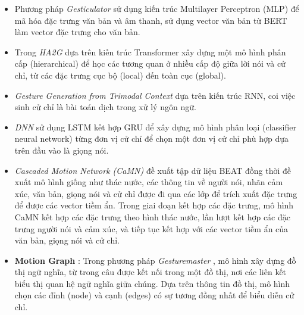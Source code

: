 \begin{itemize}[]
	\item Phương pháp \textit{Gesticulator} \cite{kucherenko2020gesticulator} sử dụng kiến trúc Multilayer Perceptron (MLP) để mã hóa đặc trưng văn bản và âm thanh, sử dụng vector văn bản từ BERT làm vector đặc trưng cho văn bản. 
	
	\item Trong \textit{HA2G} \cite{liu2022learning} dựa trên kiến trúc Transformer xây dựng một mô hình phân cấp (hierarchical) để học các tương quan ở nhiều cấp độ giữa lời nói và cử chỉ, từ các đặc trưng cục bộ (local) đến toàn cục (global). 
	
	\item \textit{Gesture Generation from Trimodal Context} \cite{yoon2020speech} dựa trên kiến trúc RNN, coi việc sinh cử chỉ là bài toán dịch trong xử lý ngôn ngữ. 
	
	\item \textit{DNN} \cite{chiu2015predicting} sử dụng LSTM kết hợp GRU để xây dựng mô hình phân loại (classifier neural network) từng đơn vị cử chỉ để chọn một đơn vị cử chỉ phù hợp dựa trên đầu vào là giọng nói. 
	
	\item \textit{Cascaded Motion Network (CaMN)} \cite{liu2022beat} đề xuất tập dữ liệu BEAT đồng thời đề xuất mô hình giống như thác nước, các thông tin về người nói, nhãn cảm xúc, văn bản, giọng nói và cử chỉ được đi qua các lớp để trích xuất đặc trưng để được các vector tiềm ẩn. Trong giai đoạn kết hợp các đặc trưng, mô hình CaMN kết hợp các đặc trưng theo hình thác nước, lần lượt kết hợp các đặc trưng người nói và cảm xúc, và tiếp tục kết hợp với các vector tiềm ẩn của văn bản, giọng nói và cử chỉ.
	
	\item \textbf{Motion Graph} : Trong phương pháp \textit{Gesturemaster} \cite{zhou2022gesturemaster}, mô hình xây dựng đồ thị ngữ nghĩa, từ trong câu được kết nối trong một đồ thị, nơi các liên kết biểu thị quan hệ ngữ nghĩa giữa chúng. Dựa trên thông tin đồ thị, mô hình chọn các đỉnh (node) và cạnh (edges) có sự tương đồng nhất để biểu diễn cử chỉ. 
	
\end{itemize}





